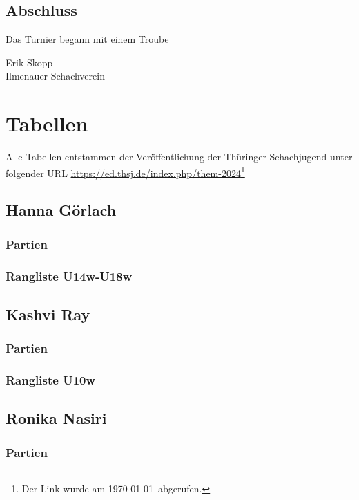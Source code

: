 \documentclass[a4paper,ngerman]{tui-algo-seminar}
\begin{document}
\subsection{Abschluss}
Das Turnier begann mit einem Troube


\vspace{2cm}
Erik Skopp\\
Ilmenauer Schachverein\\
\clearpage


\section{Tabellen}
Alle Tabellen entstammen der Veröffentlichung der Thüringer Schachjugend unter folgender URL \url{https://ed.thsj.de/index.php/them-2024}\footnote{Der Link wurde am \today ~abgerufen.}

\subsection{Hanna Görlach}
    \subsubsection{Partien}
        
    \subsubsection{Rangliste U14w-U18w}
        
\clearpage

\subsection{Kashvi Ray}
    \subsubsection{Partien}
        
    \subsubsection{Rangliste U10w}
        
\clearpage

\subsection{Ronika Nasiri}
    \subsubsection{Partien}
        
\end{document}
